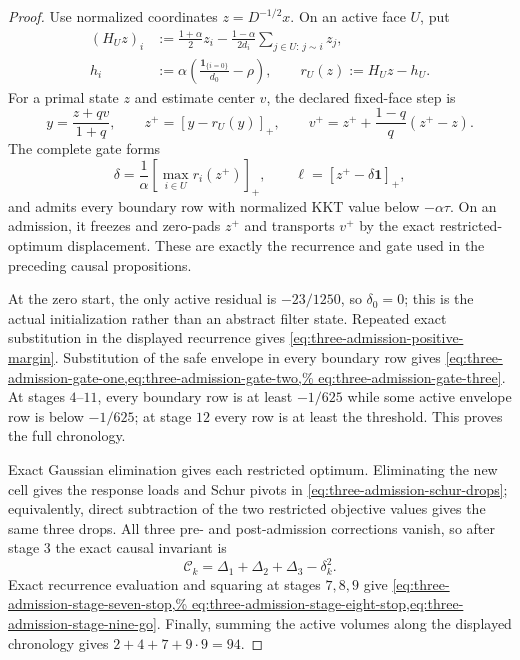 \begin{proof}
Use normalized coordinates $z=D^{-1/2}x$.  On an active face $U$, put
\begin{align*}
 (H_Uz)_i
 &:=\frac{1+\alpha}{2}z_i
   -\frac{1-\alpha}{2d_i}
    \sum_{j\in U:\,j\sim i}z_j,\\
 h_i&:=\alpha\left(\frac{\mathbf 1_{\{i=0\}}}{d_0}-\rho\right),
 \qquad r_U(z):=H_Uz-h_U.
\end{align*}
For a primal state $z$ and estimate center $v$, the declared fixed-face step
is
\begin{equation*}
 y=\frac{z+qv}{1+q},
 \qquad
 z^+=\left[y-r_U(y)\right]_+,
 \qquad
 v^+=z^++\frac{1-q}{q}(z^+-z).
\end{equation*}
The complete gate forms
\begin{equation*}
 \delta=\frac1\alpha\left[\max_{i\in U}r_i(z^+)\right]_+,
 \qquad \ell=[z^+-\delta\mathbf 1]_+,
\end{equation*}
and admits every boundary row with normalized KKT value below
$-\alpha\tau$.  On an admission, it freezes and zero-pads $z^+$ and
transports $v^+$ by the exact restricted-optimum displacement.  These are
exactly the recurrence and gate used in the preceding causal propositions.

At the zero start, the only active residual is $-23/1250$, so
$\delta_0=0$; this is the actual initialization rather than an abstract
filter state.  Repeated exact substitution in the displayed recurrence gives
\cref{eq:three-admission-positive-margin}.  Substitution of the safe envelope
in every boundary row gives
\cref{eq:three-admission-gate-one,eq:three-admission-gate-two,%
eq:three-admission-gate-three}.  At stages $4$--$11$, every boundary row is
at least $-1/625$ while some active envelope row is below $-1/625$; at stage
$12$ every row is at least the threshold.  This proves the full chronology.

Exact Gaussian elimination gives each restricted optimum.  Eliminating the
new cell gives the response loads and Schur pivots in
\cref{eq:three-admission-schur-drops}; equivalently, direct subtraction of
the two restricted objective values gives the same three drops.  All three
pre- and post-admission corrections vanish, so after stage $3$ the exact
causal invariant is
\begin{equation*}
 \mathcal C_k=\Delta_1+\Delta_2+\Delta_3-\delta_k^2.
\end{equation*}
Exact recurrence evaluation and squaring at stages $7,8,9$ give
\cref{eq:three-admission-stage-seven-stop,%
eq:three-admission-stage-eight-stop,eq:three-admission-stage-nine-go}.
Finally, summing the active volumes along the displayed chronology gives
$2+4+7+9\cdot9=94$.
\end{proof}

